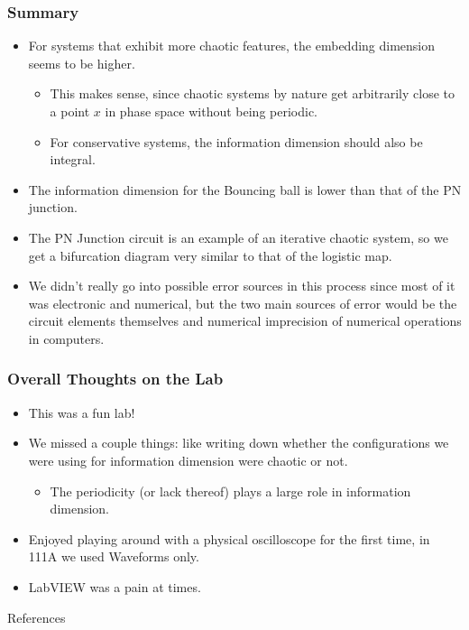 \documentclass[9pt]{beamer}
\begin{document}
\begin{frame}
	\frametitle{Summary}
	\begin{itemize}
		\item For systems that exhibit more chaotic features, the embedding dimension
			seems to be higher. 
			\begin{itemize}
				\item This makes sense, since chaotic systems by nature get
					arbitrarily close to a point \( x \) in phase space without being
					periodic. 
				\item For conservative systems, the information dimension should also
					be integral. 
			\end{itemize}
		\item The information dimension for the Bouncing ball is lower than that of
			the PN junction. 
		\item The PN Junction circuit is an example of an iterative chaotic system,
			so we get a bifurcation diagram very similar to that of the logistic map.    
		\item We didn't really go into possible error sources in this process since
			most of it was electronic and numerical, but the two main sources of
			error would be the circuit elements themselves and numerical imprecision
			of numerical operations in computers.
	\end{itemize}
\end{frame}

\begin{frame}
	\frametitle{Overall Thoughts on the Lab}
	\begin{itemize}
		\item This was a fun lab!
		\item We missed a couple things: like writing down whether the configurations
			we were using for information dimension were chaotic or not.
			\begin{itemize}
				\item The periodicity (or lack thereof) plays a large role 
					in information dimension.
			\end{itemize}
		\item Enjoyed playing around with a physical oscilloscope for the first time,
			in 111A we used Waveforms only. 
		\item LabVIEW was a pain at times. 
	\end{itemize}
\end{frame}

\begin{frame}{References}
	\fontsize{10pt}{12pt}\selectfont
	\nocite{*}
	 
	
\end{frame}
\end{document}
